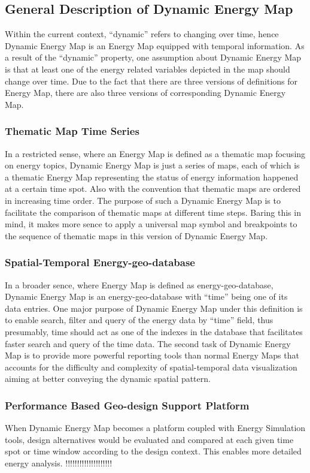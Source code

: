 \documentclass[hidelinks,12pt]{article}
\begin{document}
\subsection{General Description of Dynamic Energy Map}
Within the current context, ``dynamic'' refers to changing over time,
hence Dynamic Energy Map is an Energy Map equipped with temporal
information. As a result of the ``dynamic'' property, one assumption
about Dynamic Energy Map is that at least one of the energy related
variables depicted in the map should change over time. Due to the fact
that there are three versions of definitions for Energy Map, there are
also three versions of corresponding Dynamic Energy Map.

\subsubsection{Thematic Map Time Series}
In a restricted sense, where an Energy Map is defined as a thematic
map focusing on energy topics, Dynamic Energy Map is just a series of
maps, each of which is a thematic Energy Map representing the status
of energy information happened at a certain time spot. Also with the
convention that thematic maps are ordered in increasing time order.
The purpose of such a Dynamic Energy Map is to facilitate the
comparison of thematic maps at different time steps. Baring this in
mind, it makes more sence to apply a universal map symbol and
breakpoints to the sequence of thematic maps in this version of
Dynamic Energy Map.

\subsubsection{Spatial-Temporal Energy-geo-database}
In a broader sence, where Energy Map is defined as
energy-geo-database, Dynamic Energy Map is an energy-geo-database with
``time'' being one of its data entries. One major purpose of Dynamic
Energy Map under this definition is to enable search, filter and query
of the energy data by ``time'' field, thus presumably, time should act
as one of the indexes in the database that facilitates faster search
and query of the time data.  The second task of Dynamic Energy Map is
to provide more powerful reporting tools than normal Energy Maps that
accounts for the difficulty and complexity of spatial-temporal data
visualization aiming at better conveying the dynamic spatial
pattern.

\subsubsection{Performance Based Geo-design Support Platform}
When Dynamic Energy Map becomes a platform coupled with Energy
Simulation tools, design alternatives would be evaluated and compared
at each given time spot or time window according to the design
context. This enables more detailed energy analysis.
!!!!!!!!!!!!!!!!!!!!
\newpage
\end{document}
